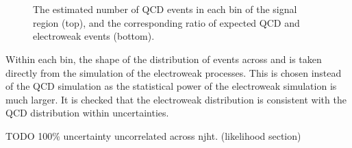 \begin{figure}[!h]
\centering
{}
 \\
 \\
\caption{The estimated number of QCD events in each \njht bin of the signal 
region (top), and the corresponding ratio of expected QCD and electroweak 
events (bottom).}
\label{fig:qcdestimation}
\end{figure}

Within each \njht bin, the shape of the distribution of events across \nb and 
\mht is taken directly from the simulation of the electroweak processes. This 
is chosen instead of the QCD simulation as the statistical power of the 
electroweak simulation is much larger. It is checked that the electroweak 
\nbmht distribution is consistent with the QCD distribution within 
uncertainties.


TODO 100\% uncertainty uncorrelated across njht. (likelihood section)


